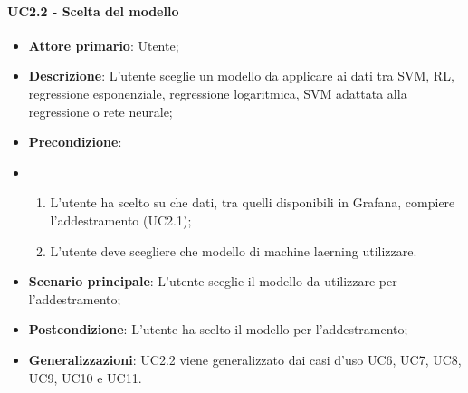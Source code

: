 \paragraph{UC2.2 - Scelta del modello}
\label{para:uc2.2}
\begin{itemize}
  \item \textbf{Attore primario}: Utente;
  \item \textbf{Descrizione}: L'utente sceglie un modello da applicare ai dati tra SVM, RL, regressione esponenziale, regressione logaritmica, SVM adattata alla regressione o rete neurale;
  \item \textbf{Precondizione}:
  \item \begin{enumerate}
    \item L'utente ha scelto su che dati, tra quelli disponibili in Grafana, compiere l'addestramento (UC2.1);
    \item L'utente deve scegliere che modello di machine laerning utilizzare.
  \end{enumerate}
  \item \textbf{Scenario principale}: L'utente sceglie il modello da utilizzare per l'addestramento;
  \item \textbf{Postcondizione}: L'utente ha scelto il modello per l'addestramento;
  \item \textbf{Generalizzazioni}: UC2.2 viene generalizzato dai casi d'uso UC6, UC7, UC8, UC9, UC10 e UC11.
\end{itemize}

